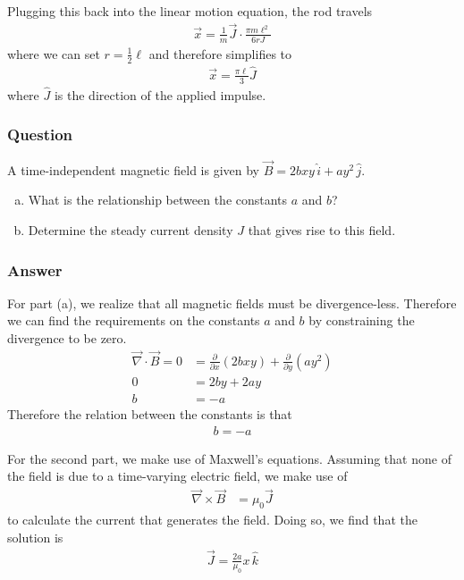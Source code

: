 Plugging this back into the linear motion equation, the rod travels
\begin{align*}
    \vec x = \frac{1}{m} \vec J \cdot  \frac{{\pi} m\ell ^2}{6 rJ}
\end{align*}
where we can set $r = \frac 12 \ell $ and therefore simplifies to
\begin{align}
    \boxed{
    \vec x = \frac{{\pi}\ell }{3} \hat J
    }
\end{align}
where $\hat J$ is the direction of the applied impulse.

\subsubsection{Question}

A time-independent magnetic field is given by $\vec B = 2bxy \,\hat i  +
ay^2 \,\hat j$.
\begin{enumerate}[a)]
    \item What is the relationship between the constants $a$ and $b$?
    \item Determine the steady current density $J$ that gives rise to this field.
\end{enumerate}

\subsubsection{Answer}
For part (a), we realize that all magnetic fields must be divergence-less.
Therefore we can find the requirements on the constants $a$ and $b$ by
constraining the divergence to be zero.
\begin{align*}
    \vec \nabla \cdot \vec B = 0 &= \frac{\partial }{\partial x}(2bxy) + \frac{\partial }{\partial y}(ay^2) \\
    0 &= 2by + 2ay \\
    b &= -a
\end{align*}
Therefore the relation between the constants is that
\begin{align}
    \boxed {b = -a}
\end{align}

For the second part, we make use of Maxwell's equations. Assuming that none of
the field is due to a time-varying electric field, we make use of
\begin{align*}
    \vec \nabla  \times  \vec B &= {\mu}_0 \vec J
\end{align*}
to calculate the current that generates the field. Doing so, we find that the
solution is
\begin{align}
    \boxed{ \vec J = \frac{2a}{{\mu}_0} x \,\hat k }
\end{align}

